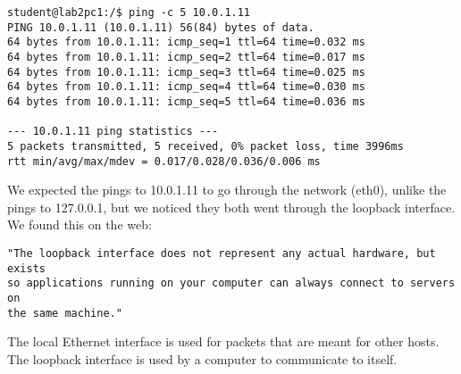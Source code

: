 \begin{lstlisting}
student@lab2pc1:/$ ping -c 5 10.0.1.11
PING 10.0.1.11 (10.0.1.11) 56(84) bytes of data.
64 bytes from 10.0.1.11: icmp_seq=1 ttl=64 time=0.032 ms
64 bytes from 10.0.1.11: icmp_seq=2 ttl=64 time=0.017 ms
64 bytes from 10.0.1.11: icmp_seq=3 ttl=64 time=0.025 ms
64 bytes from 10.0.1.11: icmp_seq=4 ttl=64 time=0.030 ms
64 bytes from 10.0.1.11: icmp_seq=5 ttl=64 time=0.036 ms

--- 10.0.1.11 ping statistics ---
5 packets transmitted, 5 received, 0% packet loss, time 3996ms
rtt min/avg/max/mdev = 0.017/0.028/0.036/0.006 ms
\end{lstlisting}

We expected the pings to 10.0.1.11 to go through the network (eth0), unlike the pings to 127.0.0.1, but we noticed they both went through the loopback interface.\\ 
We found this on the web:\begin{verbatim}
"The loopback interface does not represent any actual hardware, but exists
so applications running on your computer can always connect to servers on
the same machine."
\end{verbatim}
The local Ethernet interface is used for packets that are meant for other hosts.\\
The loopback interface is used by a computer to communicate to itself.